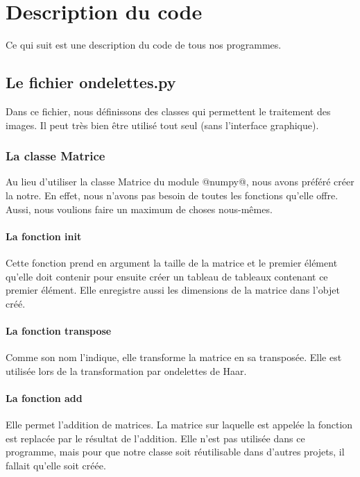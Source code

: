 \documentclass{article}
\begin{document}
\clearpage

\section{Description du code}

Ce qui suit est une description du code de tous nos programmes.

\subsection{Le fichier ondelettes.py }

Dans ce fichier, nous définissons des classes qui permettent le traitement des images. Il peut très bien être utilisé tout seul (sans l'interface graphique). 

\subsubsection{La classe Matrice }

Au lieu d'utiliser la classe Matrice du module @numpy@, nous avons préféré créer la notre. En effet, nous n'avons pas besoin de toutes les fonctions qu'elle offre. Aussi, nous voulions faire un maximum de choses nous-mêmes.

\paragraph{La fonction init }

Cette fonction prend en argument la taille de la matrice et le premier élément qu'elle doit contenir pour ensuite créer un tableau de tableaux contenant ce premier élément. Elle enregistre aussi les dimensions de la matrice dans l'objet créé.

\paragraph{La fonction transpose }

Comme son nom l'indique, elle transforme la matrice en sa transposée. Elle est utilisée lors de la transformation par ondelettes de Haar.

\paragraph{La fonction add}

Elle permet l'addition de matrices. La matrice sur laquelle est appelée la fonction est replacée par le résultat de l'addition. Elle n'est pas utilisée dans ce programme, mais pour que notre classe soit réutilisable dans d'autres projets, il fallait qu'elle soit créée.
\end{document}

